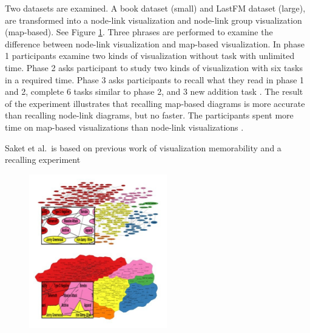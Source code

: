 \documentclass{egpubl}
\begin{document}
Two datasets are examined. A book dataset (small) and LastFM dataset (large), are transformed into a node-link visualization and node-link group visualization (map-based). See Figure \ref{fig:saket2015}.
Three phrases are performed to examine the difference between node-link visualization and map-based visualization. In phase 1 participants examine two kinds of visualization without task with unlimited time. Phase 2 asks participant to study two kinds of visualization with six tasks in a required time. Phase 3 asks participants to recall what they read in phase 1 and 2, complete 6 tasks similar to phase 2, and 3 new addition task \cite{saket2015}.
The result of the experiment illustrates that recalling map-based diagrams is more accurate than recalling node-link diagrams, but no faster.
The participants spent more time on map-based visualizations than node-link visualizations \cite{saket2015}.  

Saket et al.\ is based on previous work of visualization memorability \cite{bateman} and a recalling experiment \cite{isola2011}
\begin{figure}
\begingroup
\centering
\includegraphics[width=6cm]{./images/saket2015}
\label{fig:saket2015}
\endgroup
\end{figure}
\end{document}
